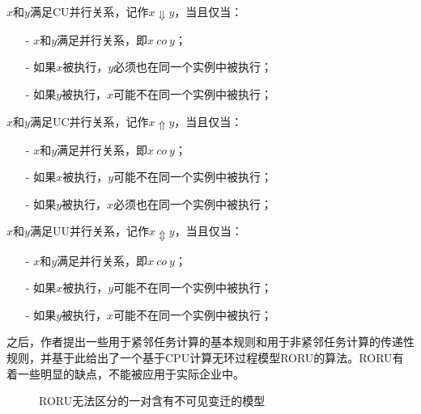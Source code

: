 \begin{definition}\label{def:c_u_concurrency}
$x$和$y$满足CU并行关系，记作$x\Downarrow y$，当且仅当：
  \begin{itemize}
    \item[-] $x$和$y$满足并行关系，即$x~co~y$；
    \item[-] 如果$x$被执行，$y$必须也在同一个实例中被执行；
    \item[-] 如果$y$被执行，$x$可能不在同一个实例中被执行；
  \end{itemize}
\end{definition}

\begin{definition}\label{def:u_c_concurrency}
$x$和$y$满足UC并行关系，记作$x\Uparrow y$，当且仅当：
  \begin{itemize}
    \item[-] $x$和$y$满足并行关系，即$x~co~y$；
    \item[-] 如果$x$被执行，$y$可能不在同一个实例中被执行；
    \item[-] 如果$y$被执行，$x$必须也在同一个实例中被执行；
  \end{itemize}
\end{definition}

\begin{definition}\label{def:u_u_concurrency}
$x$和$y$满足UU并行关系，记作$x\Updownarrow y$，当且仅当：
  \begin{itemize}
    \item[-] $x$和$y$满足并行关系，即$x~co~y$；
    \item[-] 如果$x$被执行，$y$可能不在同一个实例中被执行；
    \item[-] 如果$y$被执行，$x$可能不在同一个实例中被执行；
  \end{itemize}
\end{definition}

之后，作者提出一些用于紧邻任务计算的基本规则和用于非紧邻任务计算的传递性规则，并基于此给出了一个基于CPU计算无环过程模型RORU的算法。RORU有着一些明显的缺点，不能被应用于实际企业中。

\begin{figure}[htbp]
  \centering
  \hspace{1em}
  \caption{RORU无法区分的一对含有不可见变迁的模型}
  \label{fig:sda_example}
\end{figure}

